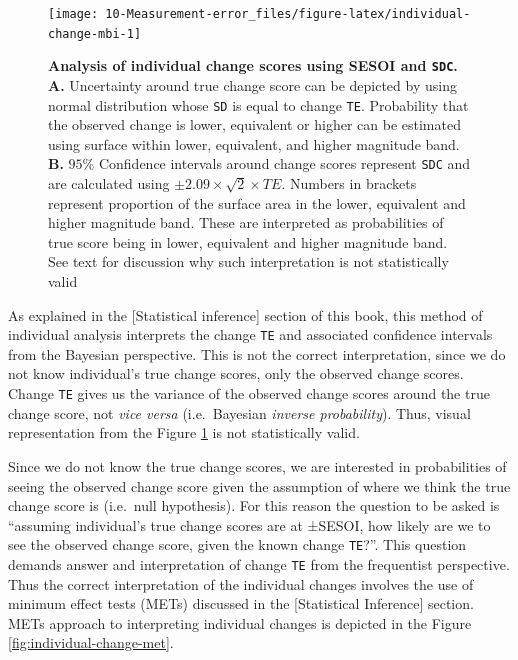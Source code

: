 \documentclass[
]{book}
\begin{document}
\begin{figure}

{\centering \texttt{[image: 10-Measurement-error\_files/figure-latex/individual-change-mbi-1]} 

}

\caption{\textbf{Analysis of individual change scores using SESOI and \texttt{SDC}. A.} Uncertainty around true change score can be depicted by using normal distribution whose \texttt{SD} is equal to change \texttt{TE}. Probability that the observed change is lower, equivalent or higher can be estimated using surface within lower, equivalent, and higher magnitude band. \textbf{B.} \(95\%\) Confidence intervals around change scores represent \texttt{SDC} and are calculated using \(\pm 2.09\times\sqrt{2}\times TE\). Numbers in brackets represent proportion of the surface area in the lower, equivalent and higher magnitude band. These are interpreted as probabilities of true score being in lower, equivalent and higher magnitude band. See text for discussion why such interpretation is not statistically valid}\label{fig:individual-change-mbi}
\end{figure}



As explained in the {[}Statistical inference{]} section of this book, this method of individual analysis interprets the change \texttt{TE} and associated confidence intervals from the Bayesian perspective. This is not the correct interpretation, since we do not know individual's true change scores, only the observed change scores. Change \texttt{TE} gives us the variance of the observed change scores around the true change score, not \emph{vice versa} (i.e.~Bayesian \emph{inverse probability}). Thus, visual representation from the Figure \ref{fig:individual-change-mbi} is not statistically valid.

Since we do not know the true change scores, we are interested in probabilities of seeing the observed change score given the assumption of where we think the true change score is (i.e.~null hypothesis). For this reason the question to be asked is ``assuming individual's true change scores are at ±SESOI, how likely are we to see the observed change score, given the known change \texttt{TE}?''. This question demands answer and interpretation of change \texttt{TE} from the frequentist perspective. Thus the correct interpretation of the individual changes involves the use of minimum effect tests (METs) discussed in the {[}Statistical Inference{]} section. METs approach to interpreting individual changes is depicted in the Figure \ref{fig:individual-change-met}.
\end{document}

